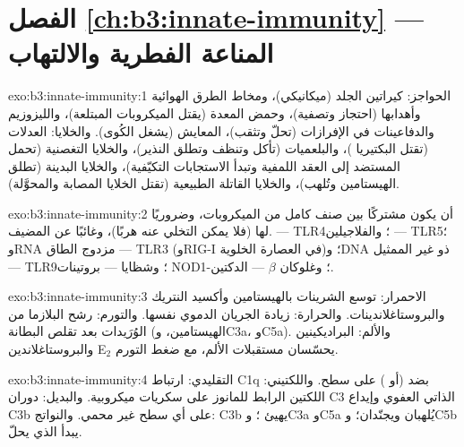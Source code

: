 \section*{الفصل \ref{ch:b3:innate-immunity} --- المناعة الفطرية والالتهاب}

\begin{solution}{exo:b3:innate-immunity:1}
الحواجز: كيراتين الجلد (ميكانيكي)، ومخاط الطرق الهوائية
وأهدابها (احتجاز وتصفية)، وحمض المعدة (يقتل الميكروبات
المبتلعة)، والليزوزيم والدفاعينات في الإفرازات (تحلّ
وتثقب)،  المعايش (يشغل الكُوى). والخلايا:
العدلات (تقتل البكتيريا )، والبلعميات (تأكل وتنظف
وتطلق النذير)، والخلايا التغصنية (تحمل المستضد إلى العقد
اللمفية وتبدأ الاستجابات التكيّفية)، والخلايا البدينة (تطلق
الهيستامين وتُلهب)، والخلايا القاتلة الطبيعية (تقتل الخلايا
المصابة والمحوَّلة).
\end{solution}

\begin{solution}{exo:b3:innate-immunity:2}
أن يكون مشتركًا بين صنف كامل من الميكروبات، وضروريًا لها
(فلا يمكن التخلي عنه هربًا)، وغائبًا عن المضيف.  --- TLR4؛ والفلاجيلين --- TLR5؛ وRNA مزدوج
الطاق --- TLR3 (وRIG-I في العصارة الخلوية)؛ وDNA ذو  غير
الممثيل --- TLR9؛ وشظايا  --- بروتينات NOD؛
وغلوكان $\beta$ --- الدكتين-1.
\end{solution}

\begin{solution}{exo:b3:innate-immunity:3}
الاحمرار: توسع الشرينات بالهيستامين وأكسيد النتريك
والبروستاغلاندينات. والحرارة: زيادة الجريان الدموي نفسها.
والتورم: رشح البلازما من الوُرَيدات بعد تقلص البطانة
(الهيستامين، وC3a، وC5a). والألم: البراديكينين
والبروستاغلاندين E$_{2}$ يحسّسان مستقبلات الألم، مع ضغط
التورم.
\end{solution}

\begin{solution}{exo:b3:innate-immunity:4}
التقليدي: ارتباط C1q بضد (أو ) على سطح.
واللكتيني: اللكتين الرابط للمانوز على سكريات ميكروبية.
والبديل: دوران C3 الذاتي العفوي وإيداع C3b على أي سطح غير
محمي. والنواتج: C3b يهيئ  ؛ وC3a وC5a
يُلهبان ويجنّدان؛ وC5b يبدأ  الذي يحلّ.
\end{solution}

